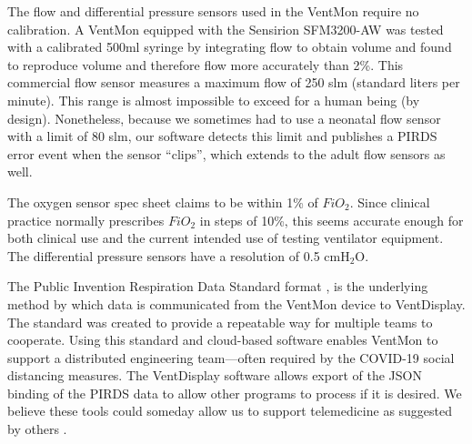 \documentclass[11pt, letterpaper]{article}
\begin{document}
The flow and differential pressure sensors used in the VentMon require no calibration. A VentMon equipped with the Sensirion SFM3200-AW was tested with a calibrated 500ml syringe by integrating flow to obtain volume and found to reproduce volume and therefore flow more accurately than 2\%. This commercial flow sensor measures a maximum flow of 250 slm (standard liters per minute). This range is almost impossible to exceed for a human being (by design). Nonetheless, because we sometimes had to use a neonatal flow sensor with a limit of 80 slm, our software detects this limit and publishes a PIRDS error event when the sensor ``clips'', which extends to the adult flow sensors as well.

The oxygen sensor spec sheet claims to be within 1\% of  $FiO_2$. Since clinical practice normally prescribes $FiO_2$ in steps of 10\%, this seems accurate enough for both clinical use and
the current intended use of testing ventilator equipment. The differential pressure sensors have a resolution of 0.5 cmH$_2$O.

The Public Invention Respiration Data Standard format \cite{PIRDS}, is the underlying method by which data is communicated from the VentMon device to VentDisplay. The standard was created to provide a repeatable way for multiple teams to cooperate. Using this standard and cloud-based software enables VentMon to support a distributed engineering team---often required by the COVID-19 social distancing measures. The VentDisplay software allows export of the JSON binding of the PIRDS data to allow other programs to process if it is desired. We believe these tools could someday allow us to support telemedicine as suggested by others \cite{rehm2018development}.
\end{document}
